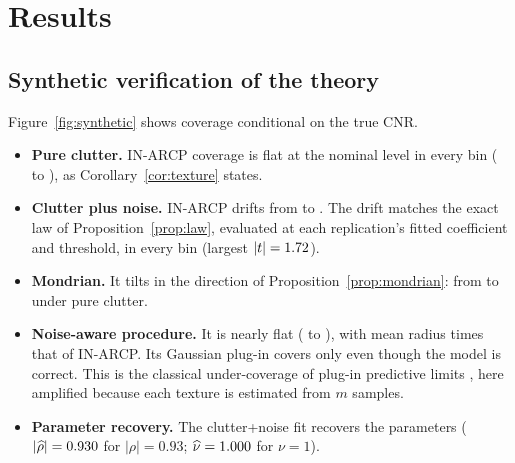\section{Results}
\subsection{Synthetic verification of the theory}
Figure~\ref{fig:synthetic} shows coverage conditional on the true CNR.
\begin{itemize}[leftmargin=*,itemsep=1pt]
\item \textbf{Pure clutter.} IN-ARCP coverage is flat at the nominal level in every bin (\SynSirvInLow{} to \SynSirvInHigh{}), as Corollary~\ref{cor:texture} states.
\item \textbf{Clutter plus noise.} IN-ARCP drifts from \SynNoiseInLow{} to \SynNoiseInHigh{}. The drift matches the exact law of Proposition~\ref{prop:law}, evaluated at each replication's fitted coefficient and threshold, in every bin (largest $|t|=1.72$).
\item \textbf{Mondrian.} It tilts in the direction of Proposition~\ref{prop:mondrian}: from \SynSirvMonLow{} to \SynSirvMonHigh{} under pure clutter.
\item \textbf{Noise-aware procedure.} It is nearly flat (\SynNaLow{} to \SynNaHigh{}), with mean radius \SynNaRatio{} times that of IN-ARCP. Its Gaussian plug-in covers only \SynNaGCov{} even though the model is correct. This is the classical under-coverage of plug-in predictive limits \cite{barndorff1996,vidoni2009,lawless2005}, here amplified because each texture is estimated from $m$ samples.
\item \textbf{Parameter recovery.} The clutter+noise fit recovers the parameters ($|\widehat\rho|=0.930$ for $|\rho|=0.93$; $\widehat\nu=1.000$ for $\nu=1$).
\end{itemize}

